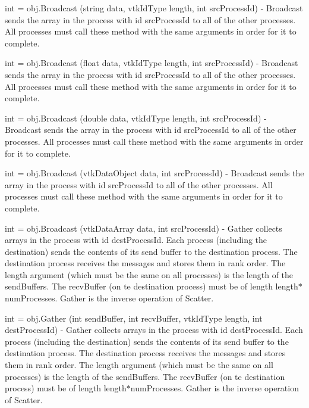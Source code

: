 \begin{DoxyItemize}
\item {\ttfamily int = obj.\-Broadcast (string data, vtk\-Id\-Type length, int src\-Process\-Id)} -\/ Broadcast sends the array in the process with id {\ttfamily src\-Process\-Id} to all of the other processes. All processes must call these method with the same arguments in order for it to complete.  
\item {\ttfamily int = obj.\-Broadcast (float data, vtk\-Id\-Type length, int src\-Process\-Id)} -\/ Broadcast sends the array in the process with id {\ttfamily src\-Process\-Id} to all of the other processes. All processes must call these method with the same arguments in order for it to complete.  
\item {\ttfamily int = obj.\-Broadcast (double data, vtk\-Id\-Type length, int src\-Process\-Id)} -\/ Broadcast sends the array in the process with id {\ttfamily src\-Process\-Id} to all of the other processes. All processes must call these method with the same arguments in order for it to complete.  
\item {\ttfamily int = obj.\-Broadcast (vtk\-Data\-Object data, int src\-Process\-Id)} -\/ Broadcast sends the array in the process with id {\ttfamily src\-Process\-Id} to all of the other processes. All processes must call these method with the same arguments in order for it to complete.  
\item {\ttfamily int = obj.\-Broadcast (vtk\-Data\-Array data, int src\-Process\-Id)} -\/ Gather collects arrays in the process with id {\ttfamily dest\-Process\-Id}. Each process (including the destination) sends the contents of its send buffer to the destination process. The destination process receives the messages and stores them in rank order. The {\ttfamily length} argument (which must be the same on all processes) is the length of the send\-Buffers. The {\ttfamily recv\-Buffer} (on te destination process) must be of length length$\ast$num\-Processes. Gather is the inverse operation of Scatter.  
\item {\ttfamily int = obj.\-Gather (int send\-Buffer, int recv\-Buffer, vtk\-Id\-Type length, int dest\-Process\-Id)} -\/ Gather collects arrays in the process with id {\ttfamily dest\-Process\-Id}. Each process (including the destination) sends the contents of its send buffer to the destination process. The destination process receives the messages and stores them in rank order. The {\ttfamily length} argument (which must be the same on all processes) is the length of the send\-Buffers. The {\ttfamily recv\-Buffer} (on te destination process) must be of length length$\ast$num\-Processes. Gather is the inverse operation of Scatter.  

\end{DoxyItemize}
